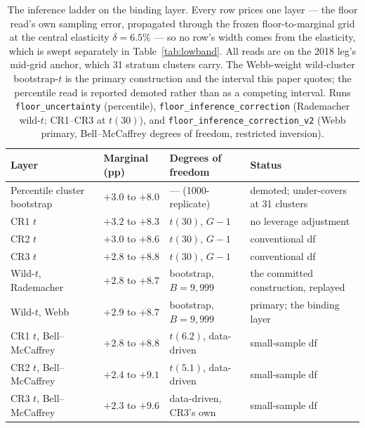 \documentclass[12pt]{article}
\begin{document}
\begin{table}[!tp]
\begin{threeparttable}
\begin{tablenotes}[flushleft]
\end{tablenotes}
\end{threeparttable}
\end{table}

\begin{table}[!t]
\centering
\caption{The inference ladder on the binding layer. Every row prices one layer --- the floor read's own sampling error, propagated through the frozen floor-to-marginal grid at the central elasticity $\delta = 6.5\%$ --- so no row's width comes from the elasticity, which is swept separately in Table~\ref{tab:lowband}. All reads are on the 2018 leg's mid-grid anchor, which 31 stratum clusters carry. The Webb-weight wild-cluster bootstrap-$t$ is the primary construction and the interval this paper quotes; the percentile read is reported demoted rather than as a competing interval. Runs \texttt{floor\_uncertainty} (percentile), \texttt{floor\_inference\_correction} (Rademacher wild-$t$; CR1--CR3 at $t(30)$), and \texttt{floor\_inference\_correction\_v2} (Webb primary, Bell--McCaffrey degrees of freedom, restricted inversion).}
\label{tab:ladder}
\footnotesize
\begin{threeparttable}
\begin{tabular}{@{}>{\raggedright\arraybackslash}p{4.0cm}>{\raggedright\arraybackslash}p{2.3cm}>{\raggedright\arraybackslash}p{2.8cm}>{\raggedright\arraybackslash}p{4.4cm}@{}}
\toprule
Layer & Marginal (pp) & Degrees of freedom & Status \\
\midrule
Percentile cluster bootstrap & $+3.0$ to $+8.0$ & --- (1000-replicate) & demoted; under-covers at 31 clusters \\
CR1 $t$ & $+3.2$ to $+8.3$ & $t(30)$, $G-1$ & no leverage adjustment \\
CR2 $t$ & $+3.0$ to $+8.6$ & $t(30)$, $G-1$ & conventional df \\
CR3 $t$ & $+2.8$ to $+8.8$ & $t(30)$, $G-1$ & conventional df \\
Wild-$t$, Rademacher & $+2.8$ to $+8.7$ & bootstrap, $B = 9{,}999$ & the committed construction, replayed \\
Wild-$t$, Webb & $+2.9$ to $+8.7$ & bootstrap, $B = 9{,}999$ & primary; the binding layer \\
CR1 $t$, Bell--McCaffrey & $+2.8$ to $+8.8$ & $t(6.2)$, data-driven & small-sample df \\
CR2 $t$, Bell--McCaffrey & $+2.4$ to $+9.1$ & $t(5.1)$, data-driven & small-sample df \\
CR3 $t$, Bell--McCaffrey & $+2.3$ to $+9.6$ & data-driven, CR3's own & small-sample df \\

\end{tabular}
\end{threeparttable}
\end{table}
\end{document}
